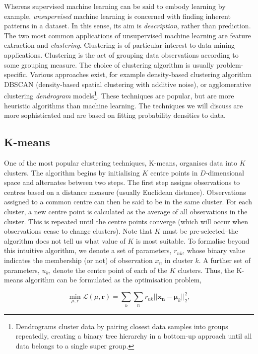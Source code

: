 \documentclass[11pt]{amsart}
\begin{document}
Whereas supervised machine learning can be said to embody learning by example, \emph{unsupervised} machine learning is concerned with finding inherent patterns in a dataset. In this sense, its aim is \emph{description}, rather than prediction. The two most common applications of unsupervised machine learning are feature extraction and \emph{clustering}. Clustering is of particular interest to data mining applications. Clustering is the act of grouping data observations according to some grouping measure. The choice of clustering algorithm is usually problem-specific. Various approaches exist, for example density-based clustering algorithm DBSCAN (density-based spatial clustering with additive noise), or agglomerative clustering \emph{dendrogram} models\footnote{Dendrograms cluster data by pairing closest data samples into groups repeatedly, creating a binary tree hierarchy in a bottom-up approach until all data belongs to a single super group.}. These techniques are popular, but are more heuristic algorithms than machine learning. The techniques we will discuss are more sophisticated and are based on fitting probability densities to data.

\subsection{K-means}

One of the most popular clustering techniques, K-means, organises data into $K$ clusters. The algorithm begins by initialising $K$ centre points in $D$-dimensional space and alternates between two steps. The first step assigns observations to centres based on a distance measure (usually Euclidean distance). Observations assigned to a common centre can then be said to be in the same cluster. For each cluster, a new centre point is calculated as the average of all observations in the cluster. This is repeated until the centre points converge (which will occur when observations cease to change clusters). Note that $K$ must be pre-selected--the algorithm does not tell us what value of $K$ is most suitable. To formalise beyond this intuitive algorithm, we denote a set of parameters, $r_{nk}$, whose binary value indicates the membership (or not) of observation $x_n$ in cluster $k$. A further set of parameters, $u_k$, denote the centre point of each of the $K$ clusters. Thus, the K-means algorithm can be formulated as the optimisation problem,

$$\min_{\mu, \mathbf{r}} \mathcal{L}(\mu, \mathbf{r}) = \sum_k\sum_n r_{nk}||\mathbf{x_n} - \mathbf{\mu}_k||^2_2,$$
\end{document}
